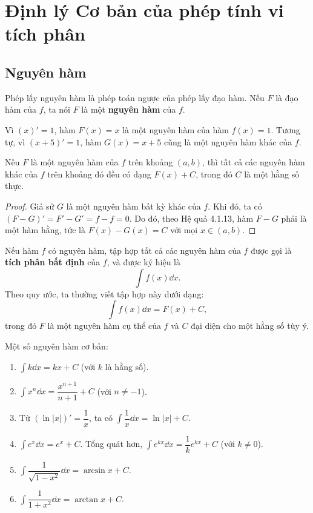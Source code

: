 \section{Định lý Cơ bản của phép tính vi tích phân}

\subsection{Nguyên hàm}
Phép lấy nguyên hàm là phép toán ngược của phép lấy đạo hàm. Nếu $F$ là đạo hàm của $f$, ta nói $F$ là một \textbf{nguyên hàm} của $f$.

\begin{example}
    Vì $(x)' = 1$, hàm $F(x) = x$ là một nguyên hàm của hàm $f(x)=1$. Tương tự, vì $(x+5)'=1$, hàm $G(x) = x+5$ cũng là một nguyên hàm khác của $f$.
\end{example}

\begin{proposition}
    Nếu $F$ là một nguyên hàm của $f$ trên khoảng $(a,b)$, thì tất cả các nguyên hàm khác của $f$ trên khoảng đó đều có dạng $F(x) + C$, trong đó $C$ là một hằng số thực.
\end{proposition}
\begin{proof}
    Giả sử $G$ là một nguyên hàm bất kỳ khác của $f$. Khi đó, ta có $(F-G)' = F' - G' = f - f = 0$.
    Do đó, theo Hệ quả 4.1.13, hàm $F-G$ phải là một hàm hằng, tức là $F(x) - G(x) = C$ với mọi $x \in (a,b)$.
\end{proof}

Nếu hàm $f$ có nguyên hàm, tập hợp tất cả các nguyên hàm của $f$ được gọi là \textbf{tích phân bất định} của $f$, và được ký hiệu là
\[ \int f(x) \dd x. \]
Theo quy ước, ta thường viết tập hợp này dưới dạng:
\[ \int f(x) \dd x = F(x) + C, \]
trong đó $F$ là một nguyên hàm cụ thể của $f$ và $C$ đại diện cho một hằng số tùy ý.

\begin{example}
    Một số nguyên hàm cơ bản:
    \begin{enumerate}[label=(\alph*)]
        \item $\int k \dd x = kx + C$ (với $k$ là hằng số).
        \item $\int x^n \dd x = \dfrac{x^{n+1}}{n+1} + C$ (với $n \neq -1$).
        \item Từ $(\ln|x|)' = \dfrac{1}{x}$, ta có $\int \dfrac{1}{x} \dd x = \ln|x| + C$.
        \item $\int e^x \dd x = e^x + C$. Tổng quát hơn, $\int e^{kx} \dd x = \dfrac{1}{k}e^{kx} + C$ (với $k \neq 0$).
        \item $\int \dfrac{1}{\sqrt{1-x^2}} \dd x = \arcsin x + C$.
        \item $\int \dfrac{1}{1+x^2} \dd x = \arctan x + C$.
    \end{enumerate}
\end{example}

